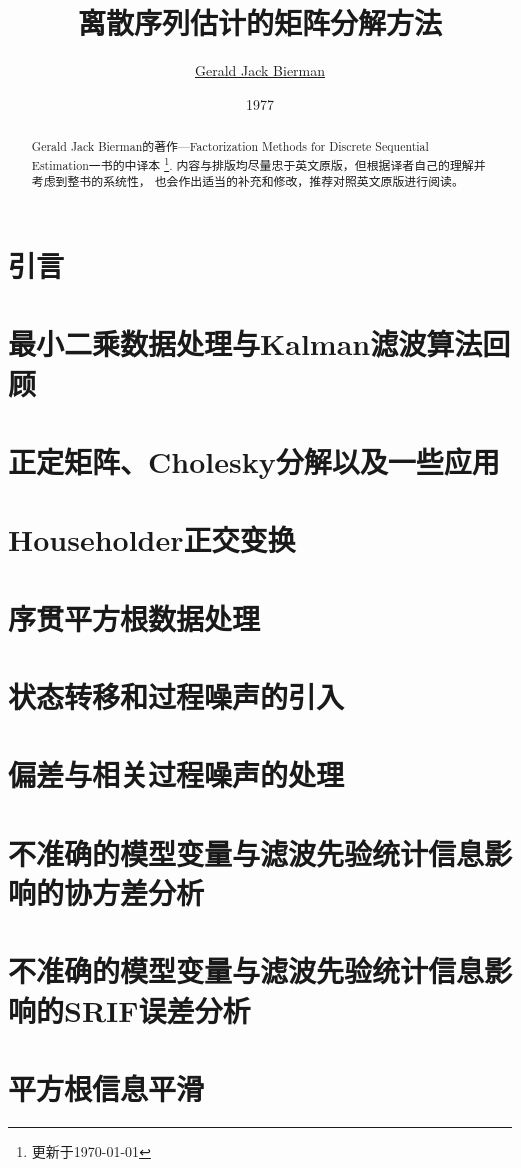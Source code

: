 \documentclass[a4paper,11pt,twoside,openright]{report}
\title{离散序列估计的矩阵分解方法}
\author{\href{http://www.malcolmdshuster.com/Pub_1988a_J_GJB-obit_scan.pdf}{Gerald Jack Bierman}}
\date{1977}
\begin{document}
\maketitle

\begin{abstract}
    Gerald Jack Bierman的著作—Factorization Methods for Discrete Sequential Estimation一书的中译本
    \footnote{更新于\today}. 内容与排版均尽量忠于英文原版，但根据译者自己的理解并考虑到整书的系统性，
    也会作出适当的补充和修改，推荐对照英文原版进行阅读。
\end{abstract}

\tableofcontents

\chapter{引言}


\chapter{最小二乘数据处理与Kalman滤波算法回顾}


\chapter{正定矩阵、Cholesky分解以及一些应用}


\chapter{Householder正交变换}


\chapter{序贯平方根数据处理}


\chapter{状态转移和过程噪声的引入}


\chapter{偏差与相关过程噪声的处理}


\chapter{不准确的模型变量与滤波先验统计信息影响的协方差分析}


\chapter{不准确的模型变量与滤波先验统计信息影响的SRIF误差分析}


\chapter{平方根信息平滑}


\printindex
\end{document}
